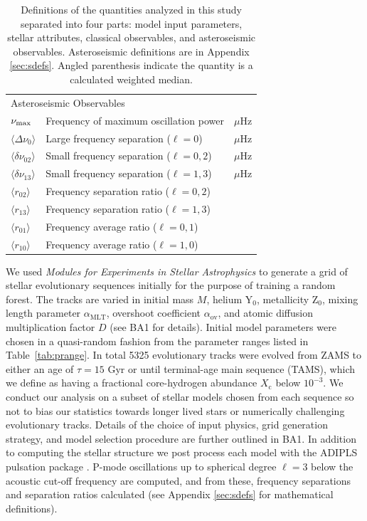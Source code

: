 \begin{table}
{\begin{tabular}{lll}
\multicolumn{3}{l}{Asteroseismic Observables} \\
$\nu_{\rm{max}}$ & Frequency of maximum oscillation power & $\mu$Hz \\
$\langle\Delta\nu_0\rangle$ & Large frequency separation ($\ell=0$) & $\mu$Hz \\
$\langle\delta\nu_{02}\rangle$ & Small frequency separation ($\ell=0,2$) & $\mu$Hz \\
$\langle\delta\nu_{13}\rangle$ & Small frequency separation ($\ell=1,3$) & $\mu$Hz \\
$\langle r_{02}\rangle$ & Frequency separation ratio ($\ell=0,2$) &  \\
$\langle r_{13}\rangle$ & Frequency separation ratio ($\ell=1,3$) &  \\
$\langle r_{01}\rangle$ & Frequency average ratio ($\ell=0,1$) & \\
$\langle r_{10}\rangle$ & Frequency average ratio ($\ell=1,0$) & \\[8pt]\hline 
\end{tabular}
}
\caption{Definitions of the quantities analyzed in this study separated into four parts: model input parameters, stellar attributes, classical observables, and asteroseismic observables. 
Asteroseismic definitions are in Appendix \ref{sec:sdefs}. 
Angled parenthesis indicate the quantity is a calculated weighted median.} 
\label{tab:parmdefs} 
\end{table} 



We used  \emph{Modules for Experiments in Stellar Astrophysics} \citep[MESA,][]{2011apjs..192....3p} to generate a grid of stellar evolutionary sequences initially for the purpose of training a random forest. The tracks are varied in initial mass $M$, helium Y$_0$, metallicity Z$_0$, mixing length parameter $\alpha_{\text{MLT}}$, overshoot coefficient $\alpha_{\text{ov}}$, and atomic diffusion multiplication factor $D$ (see BA1  for details).
Initial model parameters were chosen in a quasi-random fashion from the parameter ranges listed in Table~\ref{tab:prange}.
In total 5325 evolutionary tracks were evolved from ZAMS to either an age of $\tau=15$ Gyr or until terminal-age main sequence (TAMS), which we define as having a fractional core-hydrogen abundance $X_{\text{c}}$ below $10^{-3}$. We conduct our analysis on a subset of stellar models chosen from each sequence so not to bias our statistics towards longer lived stars or numerically challenging evolutionary tracks. 
Details of the choice of input physics, grid generation strategy, and model selection procedure are further outlined in BA1. 
In addition to computing the stellar structure we post process  each model with  the ADIPLS pulsation package \citep{2008Ap&SS.316..113C}.  P-mode oscillations up to spherical degree $\ell=3$ below the acoustic cut-off frequency are computed, and from these, frequency separations and separation ratios calculated (see Appendix \ref{sec:sdefs} for mathematical definitions). 


